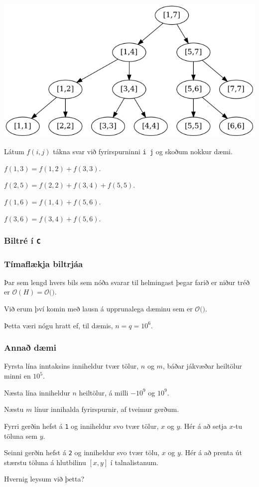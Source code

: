 {
	{
		\includegraphics[scale=0.3]{fig/mynd3.png}
		{
			\item<1-> Látum $f(i, j)$ tákna svar við fyrirspurninni \texttt{i j} og skoðum nokkur dæmi.
			{
				\item<2-> $f(1, 3) = f(1, 2) + f(3, 3)$.
				\item<3-> $f(2, 5) = f(2, 2) + f(3, 4) + f(5, 5)$.
				\item<4-> $f(1, 6) = f(1, 4) + f(5, 6)$.
				\item<5-> $f(3, 6) = f(3, 4) + f(5, 6)$.
			}
		}
	}
}

{
	\frametitle{Biltré í \texttt{C}}
}

{
	\frametitle{Tímaflækja biltrjáa}
	{
		\item<1-> Þar sem lengd hvers bils sem nóða svarar til helmingast þegar farið er niður tréð er
					$\mathcal{O}(H) = \mathcal{O}($\onslide<2->{$\log n$}$)$.
		\item<3-> Við erum því komin með lausn á upprunalega dæminu sem er $\mathcal{O}($\onslide<4->{$q \cdot \log n$}$)$.
		\item<5-> Þetta væri nógu hratt ef, til dæmis, $n = q = 10^6$.
	}
}

{
	\frametitle{Annað dæmi}
	{
		\item<1-> Fyrsta lína inntaksins inniheldur tvær tölur, $n$ og $m$, báðar jákvæðar heiltölur minni en $10^5$.
		\item<2-> Næsta lína inniheldur $n$ heiltölur, á milli $-10^9$ og $10^9$.
		\item<3-> Næstu $m$ línur innihalda fyrirspurnir, af tveimur gerðum. 
		\item<4-> Fyrri gerðin hefst á \texttt{1} og inniheldur svo tvær tölur, $x$ og $y$. Hér á að setja $x$-tu töluna sem $y$.
		\item<5-> Seinni gerðin hefst á \texttt{2} og inniheldur svo tvær tölu,
			$x$ og $y$. Hér á að prenta út stærstu töluna á hlutbilinu $[x, y]$ í talnalistanum.
		\item<6-> Hvernig leysum við þetta?
	}
}

